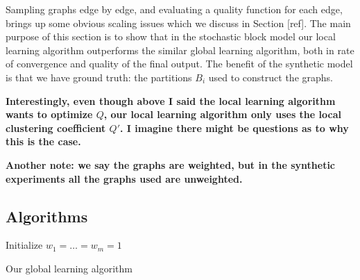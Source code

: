 \documentclass{article}[11pt]
\begin{document}
Sampling graphs edge by edge, and evaluating a quality function for each edge,
brings up some obvious scaling issues which we discuss in Section [ref]. The
main purpose of this section is to show that in the stochastic block model our
local learning algorithm outperforms the similar global learning algorithm,
both in rate of convergence and quality of the final output. The benefit of the
synthetic model is that we have ground truth: the partitions $B_i$ used to
construct the graphs.


\textbf{Interestingly, even though above I said the local learning algorithm
wants to optimize $Q$, our local learning algorithm only uses the local
clustering coefficient $Q'$. I imagine there might be questions as to why this
is the case.}

\textbf{Another note: we say the graphs are weighted, but in the synthetic
experiments all the graphs used are unweighted.}

\subsection{Algorithms}

\begin{algorithm}[thb]
   \DontPrintSemicolon
   \label{alg:global}
   \SetAlgoLined

   Initialize $w_1 = \dots = w_m = 1$\;
   \caption{Our global learning algorithm}
\end{algorithm}
\end{document}
